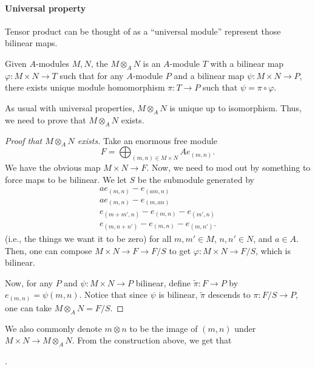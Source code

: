 \paragraph{Universal property}
Tensor product can be thought of as
a ``universal module'' represent those bilinear maps.
\begin{definition}
    Given $A$-modules $M,N$, the 
    $M\otimes_A N$ is an $A$-module $T$
    with a bilinear map $\varphi : M\times N \to T$
    such that for any $A$-module $P$ and a bilinear map
    $\psi : M\times N\to P$,
    there exists unique module homomorphism
    $\pi : T\to P$ such that $\psi = \pi\circ\varphi$.
    \begin{center}
    \end{center}
\end{definition}
As usual with universal properties,
$M\otimes_A N$ is unique up to isomorphism.
Thus, we need to prove that $M\otimes_A N$ exists.
\begin{proof}[Proof that $M\otimes_A N$ exists]
    Take an enormous free module
    $$F = \bigoplus_{(m,n)\in M\times N} Ae_{(m,n)}.$$
    We have the obvious map $M\times N\to F$.
    Now, we need to mod out by something to force maps to be bilinear.
    We let $S$ be the submodule generated by
    \begin{align*}
    ae_{(m,n)} - e_{(am,n)} \\
    ae_{(m,n)} - e_{(m,an)} \\
    e_{(m+m',n)} - e_{(m,n)} - e_{(m',n)} \\
    e_{(m,n+n')} - e_{(m,n)} - e_{(m,n')}.
    \end{align*}
    (i.e., the things we want it to be zero) for all 
    $m,m'\in M$, $n,n'\in N$, and $a\in A$.
    Then, one can compose $M\times N\to F\to F/S$
    to get $\varphi : M\times N\to F/S$, which is bilinear.

    Now, for any $P$ and $\psi:M\times N\to P$ bilinear,
    define $\widetilde\pi : F\to P$ by $e_{(m,n)} = \psi(m,n)$.
    Notice that since $\psi$ is bilinear,
    $\widetilde\pi$ descends to $\pi : F/S \to P$,
    one can take $M\otimes_A N = F/S$.
\end{proof}
We also commonly denote $m\otimes n$ to be
the image of $(m,n)$ under $M\times N\to M\otimes_A N$.
From the construction above, we get that
\begin{center}
. 
\end{center}
%
%
%
%
%
